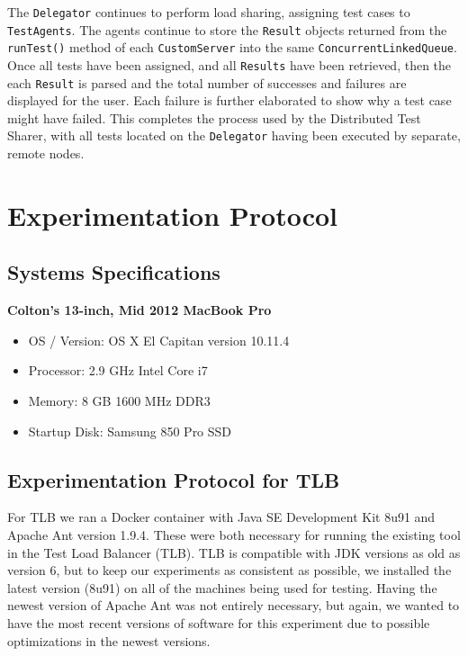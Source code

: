 \documentclass{article}
\begin{document}
{The \texttt{Delegator} continues to perform load sharing, assigning test cases to \texttt{TestAgents}.  The agents continue to store the \texttt{Result} objects returned from the \texttt{runTest()} method of each \texttt{CustomServer} into the same \texttt{ConcurrentLinkedQueue}.  Once all tests have been assigned, and all \texttt{Results} have been retrieved, then the each \texttt{Result} is parsed and the total number of successes and failures are displayed for the user.  Each failure is further elaborated to show why a test case might have failed.  This completes the process used by the Distributed Test Sharer, with all tests located on the \texttt{Delegator} having been executed by separate, remote nodes.

\section{Experimentation Protocol}
\label{experiments}

\subsection{Systems Specifications}
\label{specs}
\textbf{Colton's 13-inch, Mid 2012 MacBook Pro}
\begin{itemize}
    \item OS / Version: OS X El Capitan version 10.11.4
    \item Processor: 2.9 GHz Intel Core i7
    \item Memory: 8 GB 1600 MHz DDR3
    \item Startup Disk: Samsung 850 Pro SSD
\end{itemize}

\subsection{Experimentation Protocol for TLB}
For TLB we ran a Docker container with Java SE Development Kit 8u91 and Apache Ant version 1.9.4. These were both necessary
for running the existing tool in the Test Load Balancer (TLB). TLB is compatible with JDK versions as old as version 6, but
to keep our experiments as consistent as possible, we installed the latest version (8u91) on all of the machines being used for
testing. Having the newest version of Apache Ant was not entirely necessary, but again, we wanted to have the most
recent versions of software for this experiment due to possible optimizations in the newest versions.

}
\end{document}
